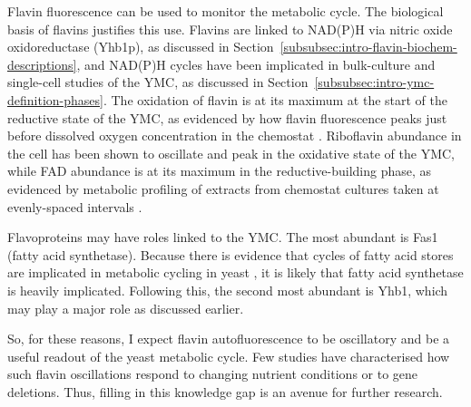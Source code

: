 Flavin fluorescence can be used to monitor the metabolic cycle.
The biological basis of flavins justifies this use.
Flavins are linked to NAD(P)H via nitric oxide oxidoreductase (Yhb1p), as discussed in Section~\ref{subsubsec:intro-flavin-biochem-descriptions}, and NAD(P)H cycles have been implicated in bulk-culture \parencite{tuLogicYeastMetabolic2005} %
and single-cell \parencite{papagiannakisAutonomousMetabolicOscillations2017} studies of the YMC, as discussed in Section~\ref{subsubsec:intro-ymc-definition-phases}.
The oxidation of flavin is at its maximum at the start of the reductive state of the YMC, as evidenced by how flavin fluorescence peaks just before dissolved oxygen concentration in the chemostat \parencite{murrayRedoxRegulationRespiring2011,sasidharanTimeStructureYeastMetabolism2012}.
Riboflavin abundance in the cell has been shown to oscillate and peak in the oxidative state of the YMC, while FAD abundance is at its maximum in the reductive-building phase, as evidenced by metabolic profiling of extracts from chemostat cultures taken at evenly-spaced intervals \parencite{tuCyclicChangesMetabolic2007}.

Flavoproteins may have roles linked to the YMC\@.
The most abundant is Fas1 (fatty acid synthetase).
Because there is evidence that cycles of fatty acid stores are implicated in metabolic cycling in yeast \parencite{campbellBuildingBlocksAre2020}, it is likely that fatty acid synthetase is heavily implicated.
Following this, the second most abundant is Yhb1, which may play a major role as discussed earlier.

So, for these reasons, I expect flavin autofluorescence to be oscillatory and be a useful readout of the yeast metabolic cycle.
Few studies have characterised how such flavin oscillations respond to changing nutrient conditions or to gene deletions.
Thus, filling in this knowledge gap is an avenue for further research.

